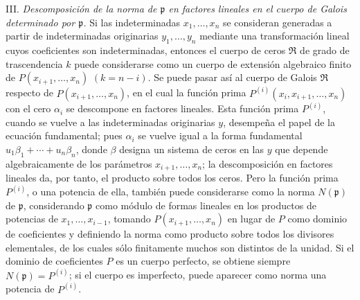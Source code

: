 \documentclass[11pt]{article}
\begin{document}
III. \emph{Descomposición de la norma de $\mathfrak p$ en factores lineales en el cuerpo de Galois determinado por $\mathfrak p$.} Si las indeterminadas $x_1,\ldots,x_n$ se consideran generadas a partir de indeterminadas originarias $y_1,\ldots,y_n$ mediante una transformación lineal cuyos coeficientes son indeterminadas, entonces el cuerpo de ceros $\mathfrak R$ de grado de trascendencia $k$ puede considerarse como un cuerpo de extensión algebraico finito de $P(x_{i+1},\ldots,x_n)$ $(k=n-i)$. Se puede pasar así al cuerpo de Galois $\mathfrak R$ respecto de $P(x_{i+1},\ldots,x_n)$, en el cual la función prima $P^{(i)}(x_i,x_{i+1},\ldots,x_n)$ con el cero $\alpha_i$ se descompone en factores lineales. Esta función prima $P^{(i)}$, cuando se vuelve a las indeterminadas originarias $y$, desempeña el papel de la ecuación fundamental; pues $\alpha_i$ se vuelve igual a la forma fundamental $u_1\beta_1+\cdots+u_n\beta_n$, donde $\beta$ designa un sistema de ceros en las $y$ que depende algebraicamente de los parámetros $x_{i+1},\ldots,x_n$; la descomposición en factores lineales da, por tanto, el producto sobre todos los ceros. Pero la función prima $P^{(i)}$, o una potencia de ella, también puede considerarse como la norma $N(\mathfrak p)$ de $\mathfrak p$, considerando $\mathfrak p$ como módulo de formas lineales en los productos de potencias de $x_1,\ldots,x_{i-1}$, tomando $P(x_{i+1},\ldots,x_n)$ en lugar de $P$ como dominio de coeficientes y definiendo la norma como producto sobre todos los divisores elementales, de los cuales sólo finitamente muchos son distintos de la unidad. Si el dominio de coeficientes $P$ es un cuerpo perfecto, se obtiene siempre $N(\mathfrak p)=P^{(i)}$; si el cuerpo es imperfecto, puede aparecer como norma una potencia de $P^{(i)}$.
\end{document}
